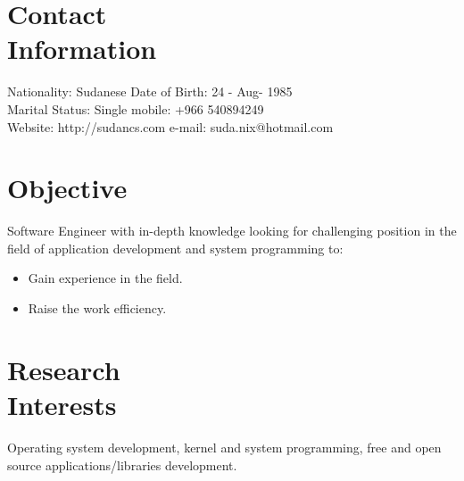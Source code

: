 \documentclass[margin,line]{resume}
\begin{document}
\begin{resume}

    \section{\mysidestyle Contact\\Information}

    Nationality: Sudanese                            \hfill Date of Birth: 24 - Aug- 1985 \vspace{0mm}\\\vspace{0mm}%
   Marital Status: Single                              \hfill mobile: +966 540894249          \vspace{0mm}\\\vspace{0mm}%
    Website:	  http://sudancs.com      \hfill e-mail: suda.nix@hotmail.com  \vspace{0mm}\\\vspace{-4.5mm}%

\section{\mysidestyle Objective}
Software Engineer with in-depth knowledge looking for challenging position in the field of application development and system programming to:
\begin{itemize}
\item Gain experience in the field.
\item Raise the work efficiency.
\end{itemize}

    \section{\mysidestyle Research\\Interests}
Operating system development, kernel and system programming, free and open source applications/libraries development.


\end{resume}
\end{document}
